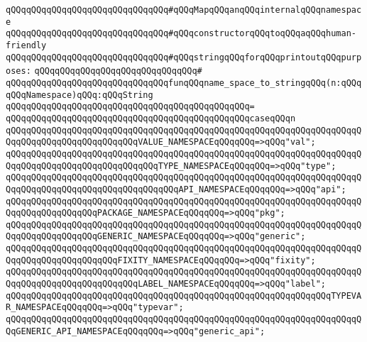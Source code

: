 \newline
\newline
\newline
\verb|qQQqqQQqqQQqqQQqqQQqqQQqqQQqqQQq#qQQqMapqQQqanqQQqinternalqQQqnamespace|\newline
\verb|qQQqqQQqqQQqqQQqqQQqqQQqqQQqqQQq#qQQqconstructorqQQqtoqQQqaqQQqhuman-friendly|\newline
\verb|qQQqqQQqqQQqqQQqqQQqqQQqqQQqqQQq#qQQqstringqQQqforqQQqprintoutqQQqpurposes:|\newline
\verb|qQQqqQQqqQQqqQQqqQQqqQQqqQQqqQQq#|\newline
\verb|qQQqqQQqqQQqqQQqqQQqqQQqqQQqqQQqfunqQQqname_space_to_stringqQQq(n:qQQqqQQqNamespace)qQQq:qQQqString|\newline
\verb|qQQqqQQqqQQqqQQqqQQqqQQqqQQqqQQqqQQqqQQqqQQqqQQq=|\newline
\verb|qQQqqQQqqQQqqQQqqQQqqQQqqQQqqQQqqQQqqQQqqQQqqQQqcaseqQQqn|\newline
\verb|qQQqqQQqqQQqqQQqqQQqqQQqqQQqqQQqqQQqqQQqqQQqqQQqqQQqqQQqqQQqqQQqqQQqqQQqqQQqqQQqqQQqqQQqqQQqqQQqVALUE_NAMESPACEqQQqqQQq=>qQQq"val";|\newline
\verb|qQQqqQQqqQQqqQQqqQQqqQQqqQQqqQQqqQQqqQQqqQQqqQQqqQQqqQQqqQQqqQQqqQQqqQQqqQQqqQQqqQQqqQQqqQQqqQQqqQQqTYPE_NAMESPACEqQQqqQQq=>qQQq"type";|\newline
\verb|qQQqqQQqqQQqqQQqqQQqqQQqqQQqqQQqqQQqqQQqqQQqqQQqqQQqqQQqqQQqqQQqqQQqqQQqqQQqqQQqqQQqqQQqqQQqqQQqqQQqqQQqAPI_NAMESPACEqQQqqQQq=>qQQq"api";|\newline
\verb|qQQqqQQqqQQqqQQqqQQqqQQqqQQqqQQqqQQqqQQqqQQqqQQqqQQqqQQqqQQqqQQqqQQqqQQqqQQqqQQqqQQqqQQqPACKAGE_NAMESPACEqQQqqQQq=>qQQq"pkg";|\newline
\verb|qQQqqQQqqQQqqQQqqQQqqQQqqQQqqQQqqQQqqQQqqQQqqQQqqQQqqQQqqQQqqQQqqQQqqQQqqQQqqQQqqQQqqQQqGENERIC_NAMESPACEqQQqqQQq=>qQQq"generic";|\newline
\verb|qQQqqQQqqQQqqQQqqQQqqQQqqQQqqQQqqQQqqQQqqQQqqQQqqQQqqQQqqQQqqQQqqQQqqQQqqQQqqQQqqQQqqQQqqQQqFIXITY_NAMESPACEqQQqqQQq=>qQQq"fixity";|\newline
\verb|qQQqqQQqqQQqqQQqqQQqqQQqqQQqqQQqqQQqqQQqqQQqqQQqqQQqqQQqqQQqqQQqqQQqqQQqqQQqqQQqqQQqqQQqqQQqqQQqLABEL_NAMESPACEqQQqqQQq=>qQQq"label";|\newline
\verb|qQQqqQQqqQQqqQQqqQQqqQQqqQQqqQQqqQQqqQQqqQQqqQQqqQQqqQQqqQQqqQQqTYPEVAR_NAMESPACEqQQqqQQq=>qQQq"typevar";|\newline
\verb|qQQqqQQqqQQqqQQqqQQqqQQqqQQqqQQqqQQqqQQqqQQqqQQqqQQqqQQqqQQqqQQqqQQqqQQqGENERIC_API_NAMESPACEqQQqqQQq=>qQQq"generic_api";|\newline
